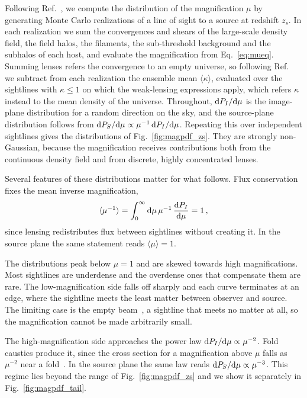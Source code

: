 \documentclass[aps,prd,10pt,nofootinbib,twocolumn,superscriptaddress,floatfix,notitlepage]{revtex4-1}
\newcommand{\td}{{\rm d}}
\newcommand{\be}{\begin{equation}}
\newcommand{\ee}{\end{equation}}
\begin{document}
Following Ref.~\cite{Vaskonen:2026ubd}, we compute the distribution of the magnification $\mu$ by generating Monte Carlo realizations of a line of sight to a source at redshift $z_s$. In each realization we sum the convergences and shears of the large-scale density field, the field halos, the filaments, the sub-threshold background and the subhalos of each host, and evaluate the magnification from Eq.~\eqref{eq:mueq}. Summing lenses refers the convergence to an empty universe, so following Ref.~\cite{Vaskonen:2026ubd} we subtract from each realization the ensemble mean $\langle\kappa\rangle$, evaluated over the sightlines with $\kappa \leq 1$ on which the weak-lensing expressions apply, which refers $\kappa$ instead to the mean density of the universe. Throughout, $\td P_I/\td\mu$ is the image-plane distribution for a random direction on the sky, and the source-plane distribution follows from $\td P_S/\td\mu \propto \mu^{-1}\,\td P_I/\td\mu$. Repeating this over independent sightlines gives the distributions of Fig.~\ref{fig:magpdf_zs}. They are strongly non-Gaussian, because the magnification receives contributions both from the continuous density field and from discrete, highly concentrated lenses.

Several features of these distributions matter for what follows. Flux conservation~\cite{Weinberg:1976jq} fixes the mean inverse magnification,
\be \label{eq:fluxsumrule}
    \langle \mu^{-1} \rangle = \int_0^\infty \td\mu \, \mu^{-1}\, \frac{\td P_I}{\td\mu} = 1 \,,
\ee
since lensing redistributes flux between sightlines without creating it. In the source plane the same statement reads $\langle\mu\rangle = 1$.

The distributions peak below $\mu = 1$ and are skewed towards high magnifications. Most sightlines are underdense and the overdense ones that compensate them are rare. The low-magnification side falls off sharply and each curve terminates at an edge, where the sightline meets the least matter between observer and source. The limiting case is the empty beam~\cite{Dyer1972dis}, a sightline that meets no matter at all, so the magnification cannot be made arbitrarily small.

The high-magnification side approaches the power law $\td P_I/\td\mu \propto \mu^{-2}$. Fold caustics produce it, since the cross section for a magnification above $\mu$ falls as $\mu^{-2}$ near a fold~\cite{Blandford:1986zz}. In the source plane the same law reads $\td P_S/\td\mu \propto \mu^{-3}$. This regime lies beyond the range of Fig.~\ref{fig:magpdf_zs} and we show it separately in Fig.~\ref{fig:magpdf_tail}.
\end{document}
